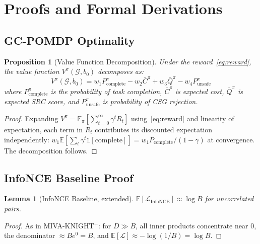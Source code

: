 \documentclass[10pt,conference]{IEEEtran}
\theoremstyle{ieeethm}
\newtheorem{lemma}[theorem]{Lemma}
\newtheorem{proposition}[theorem]{Proposition}
\theoremstyle{ieeedef}
\theoremstyle{ieeeremark}
\begin{document}
\appendix
\section{Proofs and Formal Derivations}
\label{app:proofs}

\subsection{GC-POMDP Optimality}

\begin{proposition}[Value Function Decomposition]
\label{prop:value_decomp}
Under the reward~\eqref{eq:reward}, the value function $V^\pi(\mathcal{G}, b_0)$ decomposes as:
\begin{equation}
V^\pi(\mathcal{G}, b_0) = w_1 P^\pi_\text{complete} - w_2 \bar{C}^\pi + w_3 \bar{Q}^\pi - w_4 P^\pi_\text{unsafe}
\label{eq:value_decomp}
\end{equation}
where $P^\pi_\text{complete}$ is the probability of task completion, $\bar{C}^\pi$ is expected cost, $\bar{Q}^\pi$ is expected SRC score, and $P^\pi_\text{unsafe}$ is probability of CSG rejection.
\end{proposition}
\begin{proof}
Expanding $V^\pi = \mathbb{E}_\pi[\sum_{t=0}^\infty \gamma^t R_t]$ using~\eqref{eq:reward} and linearity of expectation, each term in $R_t$ contributes its discounted expectation independently: $w_1 \mathbb{E}[\sum_t \gamma^t \mathbb{1}[\text{complete}]] = w_1 P_\text{complete}/(1-\gamma)$ at convergence. The decomposition follows.
\end{proof}

\subsection{InfoNCE Baseline Proof}

\begin{lemma}[InfoNCE Baseline, extended]
\label{lem:infonce_baseline}
$\mathbb{E}[\mathcal{L}_\text{InfoNCE}] \approx \log B$ for uncorrelated pairs.
\end{lemma}
\begin{proof}
As in \textsc{MIVA-KNIGHT}$^+$: for $D \gg B$, all inner products concentrate near $0$, the denominator $\approx B e^{0} = B$, and $\mathbb{E}[\mathcal{L}] \approx -\log(1/B) = \log B$.
\end{proof}
\end{document}
